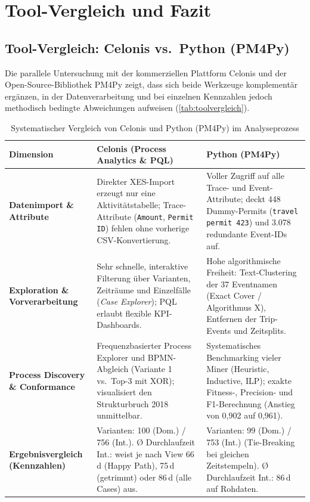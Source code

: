 \section{Tool-Vergleich und Fazit}
\label{sec:fazit}

\subsection{Tool-Vergleich: Celonis vs.\ Python (PM4Py)}
\label{sec:toolvergleich}

Die parallele Untersuchung mit der kommerziellen Plattform Celonis und der Open-Source-Bibliothek PM4Py zeigt, dass sich beide Werkzeuge komplementär ergänzen, in der Datenverarbeitung und bei einzelnen Kennzahlen jedoch methodisch bedingte Abweichungen aufweisen (\autoref{tab:toolvergleich}).

\begin{table}[htbp]
\centering
\caption{Systematischer Vergleich von Celonis und Python (PM4Py) im Analyseprozess}
\label{tab:toolvergleich}
\footnotesize
\renewcommand{\arraystretch}{1.15}
\begin{tabularx}{\textwidth}{@{}p{2.9cm} X X@{}}
\toprule
\textbf{Dimension} & \textbf{Celonis (Process Analytics \& PQL)} & \textbf{Python (PM4Py)} \\
\midrule
\textbf{Datenimport \& Attribute} &
Direkter XES-Import erzeugt nur eine Aktivitätstabelle; Trace-Attribute (\texttt{Amount}, \texttt{Permit ID}) fehlen ohne vorherige CSV-Konvertierung. &
Voller Zugriff auf alle Trace- und Event-Attribute; deckt 448 Dummy-Permits (\texttt{travel permit 423}) und 3.078 redundante Event-IDs auf. \\
\textbf{Exploration \& Vorverarbeitung} &
Sehr schnelle, interaktive Filterung über Varianten, Zeiträume und Einzelfälle (\textit{Case Explorer}); PQL erlaubt flexible KPI-Dashboards. &
Hohe algorithmische Freiheit: Text-Clustering der 37 Eventnamen (Exact Cover / Algorithmus X), Entfernen der Trip-Events und Zeitsplits. \\
\textbf{Process Discovery \& Conformance} &
Frequenzbasierter Process Explorer und BPMN-Abgleich (Variante 1 vs.\ Top-3 mit XOR); visualisiert den Strukturbruch 2018 unmittelbar. &
Systematisches Benchmarking vieler Miner (Heuristic, Inductive, ILP); exakte Fitness-, Precision- und F1-Berechnung (Anstieg von 0,902 auf 0,961). \\
\textbf{Ergebnisvergleich (Kennzahlen)} &
Varianten: 100 (Dom.) / 756 (Int.).\newline
Ø Durchlaufzeit Int.: weist je nach View 66\,d (Happy Path), 75\,d (getrimmt) oder 86\,d (alle Cases) aus. &
Varianten: 99 (Dom.) / 753 (Int.) (Tie-Breaking bei gleichen Zeitstempeln).\newline
Ø Durchlaufzeit Int.: 86\,d auf Rohdaten. \\
\bottomrule
\end{tabularx}
\end{table}

